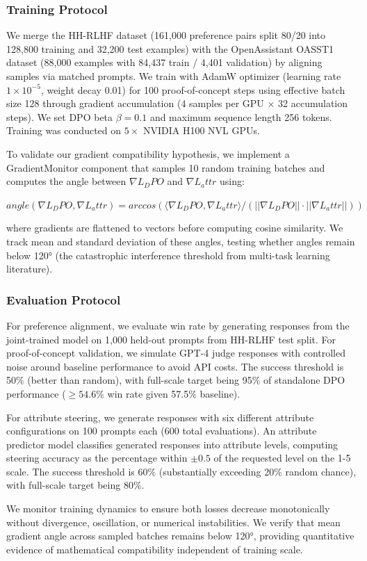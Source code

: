 \subsubsection{Training Protocol}

We merge the HH-RLHF dataset (161,000 preference pairs split 80/20 into 128,800 training and 32,200 test examples) with the OpenAssistant OASST1 dataset (88,000 examples with 84,437 train / 4,401 validation) by aligning samples via matched prompts. We train with AdamW optimizer (learning rate $1\times 10^{-5}$, weight decay 0.01) for 100 proof-of-concept steps using effective batch size 128 through gradient accumulation (4 samples per GPU $\times$ 32 accumulation steps). We set DPO beta $\beta =0.1$ and maximum sequence length 256 tokens. Training was conducted on $5\times$ NVIDIA H100 NVL GPUs.

To validate our gradient compatibility hypothesis, we implement a GradientMonitor component that samples 10 random training batches and computes the angle between $\nabla L_DPO$ and $\nabla L_attr$ using:

$angle(\nabla L_DPO, \nabla L_attr) = arccos(\langle \nabla L_DPO, \nabla L_attr\rangle / (||\nabla L_DPO|| \cdot ||\nabla L_attr||))$

where gradients are flattened to vectors before computing cosine similarity. We track mean and standard deviation of these angles, testing whether angles remain below 120° (the catastrophic interference threshold from multi-task learning literature).

\subsubsection{Evaluation Protocol}

For preference alignment, we evaluate win rate by generating responses from the joint-trained model on 1,000 held-out prompts from HH-RLHF test split. For proof-of-concept validation, we simulate GPT-4 judge responses with controlled noise around baseline performance to avoid API costs. The success threshold is 50\% (better than random), with full-scale target being 95\% of standalone DPO performance ($\geq 54.6$\% win rate given 57.5\% baseline).

For attribute steering, we generate responses with six different attribute configurations on 100 prompts each (600 total evaluations). An attribute predictor model classifies generated responses into attribute levels, computing steering accuracy as the percentage within $\pm 0.5$ of the requested level on the 1-5 scale. The success threshold is 60\% (substantially exceeding 20\% random chance), with full-scale target being 80\%.

We monitor training dynamics to ensure both losses decrease monotonically without divergence, oscillation, or numerical instabilities. We verify that mean gradient angle across sampled batches remains below 120°, providing quantitative evidence of mathematical compatibility independent of training scale.
